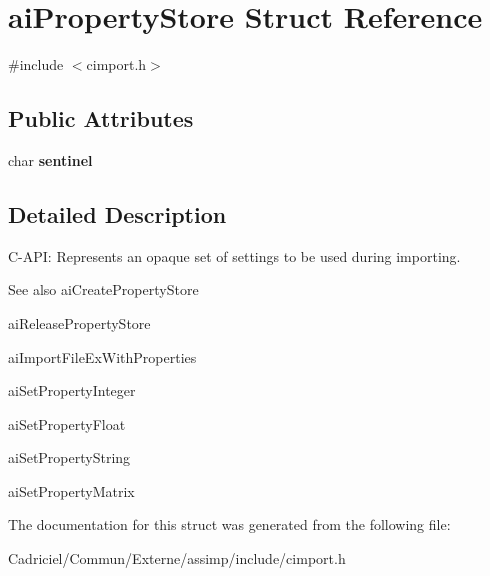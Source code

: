 \hypertarget{structai_property_store}{}\section{ai\+Property\+Store Struct Reference}
\label{structai_property_store}


{\ttfamily \#include $<$cimport.\+h$>$}

\subsection*{Public Attributes}
\begin{DoxyCompactItemize}
\item 
char {\bfseries sentinel}\hypertarget{structai_property_store_a53e97983bdbe38c596c7879555dc42a3}{}\label{structai_property_store_a53e97983bdbe38c596c7879555dc42a3}

\end{DoxyCompactItemize}


\subsection{Detailed Description}
C-\/\+A\+PI\+: Represents an opaque set of settings to be used during importing. \begin{DoxySeeAlso}{See also}
ai\+Create\+Property\+Store 

ai\+Release\+Property\+Store 

ai\+Import\+File\+Ex\+With\+Properties 

ai\+Set\+Property\+Integer 

ai\+Set\+Property\+Float 

ai\+Set\+Property\+String 

ai\+Set\+Property\+Matrix 
\end{DoxySeeAlso}


The documentation for this struct was generated from the following file\+:\begin{DoxyCompactItemize}
\item 
Cadriciel/\+Commun/\+Externe/assimp/include/cimport.\+h\end{DoxyCompactItemize}
